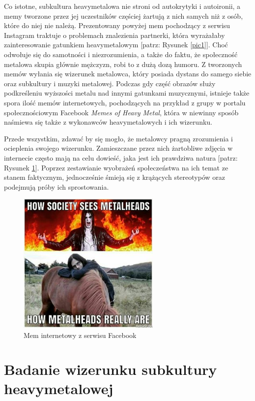 \documentclass[12pt, a4paper, titlepage]{report}
\begin{document}
Co istotne, subkultura heavymetalowa nie stroni od autokrytyki i autoironii, a memy tworzone przez jej uczestników częściej żartują z nich samych niż z osób, które do niej nie należą. Prezentowany powyżej mem pochodzący z serwisu Instagram traktuje o problemach znalezienia partnerki, która wyrażałaby zainteresowanie gatunkiem heavymetalowym [patrz: Rysunek \ref{pic1}]. Choć odwołuje się do samotności i niezrozumienia, a także do faktu, że społeczność metalowa skupia głównie mężczyzn, robi to z dużą dozą humoru. Z tworzonych memów wyłania się wizerunek metalowca, który posiada dystans do samego siebie oraz subkultury i muzyki metalowej. Podczas gdy część obrazów służy podkreśleniu wyższości metalu nad innymi gatunkami muzycznymi, istnieje także spora ilość memów internetowych, pochodzących na przykład z grupy w portalu społecznościowym Facebook \textit{Memes of Heavy Metal}, która w niewinny sposób naśmiewa się także z wykonawców heavymetalowych i ich wizerunku. 

Przede wszystkim, zdawać by się mogło, że metalowcy pragną zrozumienia i ocieplenia swojego wizerunku. Zamieszczane przez nich żartobliwe zdjęcia w internecie często mają na celu dowieść, jaka jest ich prawdziwa natura [patrz: Rysunek \ref{pic2}]. Poprzez zestawianie wyobrażeń społeczeństwa na ich temat ze stanem faktycznym, jednocześnie śmieją się z krążących stereotypów oraz podejmują próby ich sprostowania. 

\vspace{0.5cm}
\begin{figure}
\centering
\includegraphics[width=0.62\textwidth]{./img/mem2.jpg}
\caption{Mem internetowy z serwisu Facebook}
\label{pic2}
\end{figure}

\chapter{Badanie wizerunku subkultury heavymetalowej}
\end{document}

